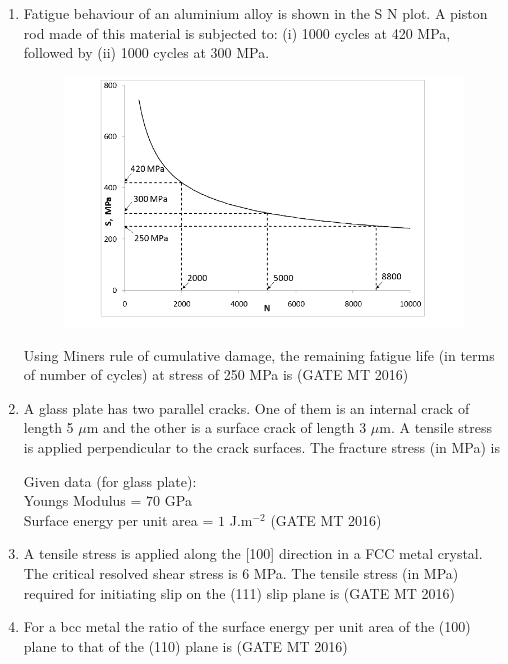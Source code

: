 \documentclass[journal, 11pt, onecolumn]{IEEEtran}
\theoremstyle{remark}
\begin{document}
\begin{enumerate}
\item Fatigue behaviour of an aluminium alloy is shown in the S N plot. A piston rod made of this material is subjected to:  
(i) 1000 cycles at 420 MPa, followed by  
(ii) 1000 cycles at 300 MPa.  
\begin{figure}[H]
    \centering
    \includegraphics[width=1\linewidth]{figs/image7'.png}
    \caption{}
    \label{fig:placeholder}
\end{figure}

Using Miner\textquotesingle s rule of cumulative damage, the remaining fatigue life (in terms of number of cycles) at stress of 250 MPa is
\hfill(GATE MT 2016)

\item A glass plate has two parallel cracks. One of them is an internal crack of length 5 $\mu$m and the other is a surface crack of length 3 $\mu$m. A tensile stress is applied perpendicular to the crack surfaces. The fracture stress (in MPa) is  

\noindent Given data (for glass plate):\\  
Young\textquotesingle s Modulus = $70$ GPa \\ 
Surface energy per unit area = $1$ J.m$^{-2}$  
\hfill(GATE MT 2016)

\item A tensile stress is applied along the [100] direction in a FCC metal crystal. The critical resolved shear stress is 6 MPa. The tensile stress (in MPa) required for initiating slip on the (111) slip plane is
\hfill(GATE MT 2016)

\item For a bcc metal the ratio of the surface energy per unit area of the (100) plane to that of the (110) plane is 
\hfill(GATE MT 2016)


\end{enumerate}
\end{document}
